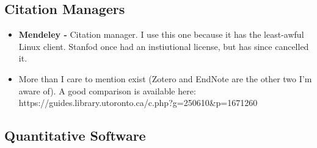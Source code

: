 \documentclass[11pt]{article}
\theoremstyle{definition}
\theoremstyle{remark}
\begin{document}
   	\subsection{Citation Managers}
    	\begin{itemize}
        	\item \textbf{Mendeley - } Citation manager.  I use this one because it has the least-awful Linux client. Stanfod once had an instiutional license, but has since cancelled it.
            \item More than I care to mention exist (Zotero and EndNote are the other two I'm aware of).  A good comparison is available here:  https://guides.library.utoronto.ca/c.php?g=250610\&p=1671260 
        \end{itemize}

    \subsection{Quantitative Software}
\end{document}
